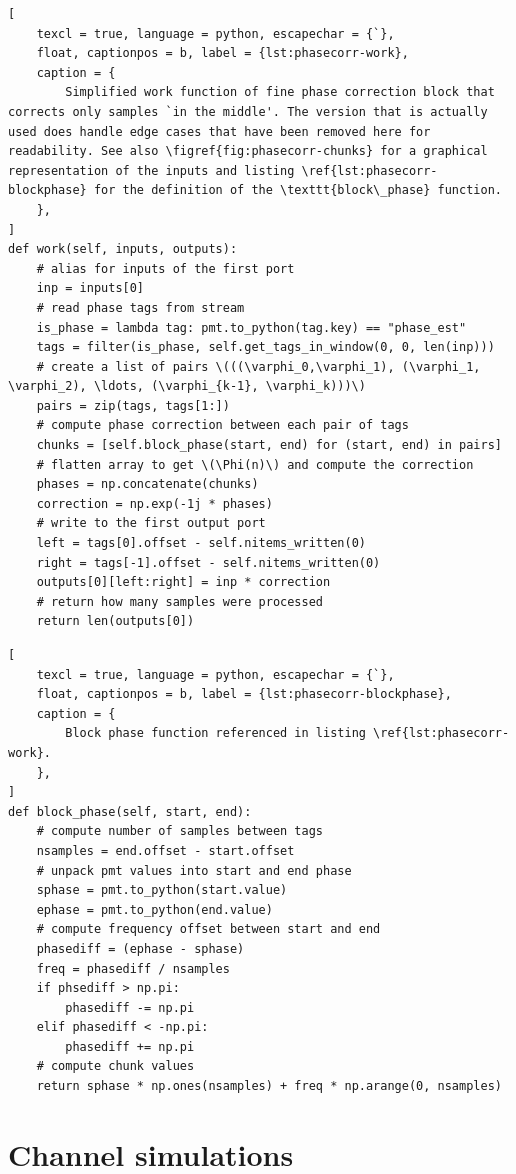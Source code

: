 \begin{lstlisting}[
	texcl = true, language = python, escapechar = {`},
	float, captionpos = b, label = {lst:phasecorr-work},
	caption = {
		Simplified work function of fine phase correction block that corrects only samples `in the middle'. The version that is actually used does handle edge cases that have been removed here for readability. See also \figref{fig:phasecorr-chunks} for a graphical representation of the inputs and listing \ref{lst:phasecorr-blockphase} for the definition of the \texttt{block\_phase} function.
	},
]
def work(self, inputs, outputs):
	# alias for inputs of the first port
	inp = inputs[0]
	# read phase tags from stream
	is_phase = lambda tag: pmt.to_python(tag.key) == "phase_est"
	tags = filter(is_phase, self.get_tags_in_window(0, 0, len(inp)))
	# create a list of pairs \(((\varphi_0,\varphi_1), (\varphi_1, \varphi_2), \ldots, (\varphi_{k-1}, \varphi_k)))\)
	pairs = zip(tags, tags[1:])
	# compute phase correction between each pair of tags
	chunks = [self.block_phase(start, end) for (start, end) in pairs]
	# flatten array to get \(\Phi(n)\) and compute the correction
	phases = np.concatenate(chunks)
	correction = np.exp(-1j * phases) 
	# write to the first output port
	left = tags[0].offset - self.nitems_written(0)
	right = tags[-1].offset - self.nitems_written(0)
	outputs[0][left:right] = inp * correction
	# return how many samples were processed
	return len(outputs[0])
\end{lstlisting}

\begin{lstlisting}[
	texcl = true, language = python, escapechar = {`},
	float, captionpos = b, label = {lst:phasecorr-blockphase},
	caption = {
		Block phase function referenced in listing \ref{lst:phasecorr-work}.
	},
]
def block_phase(self, start, end):
	# compute number of samples between tags
	nsamples = end.offset - start.offset
	# unpack pmt values into start and end phase
	sphase = pmt.to_python(start.value)
	ephase = pmt.to_python(end.value)
	# compute frequency offset between start and end
	phasediff = (ephase - sphase)
	freq = phasediff / nsamples
	if phsediff > np.pi:
		phasediff -= np.pi
	elif phasediff < -np.pi:
		phasediff += np.pi
	# compute chunk values
	return sphase * np.ones(nsamples) + freq * np.arange(0, nsamples)
\end{lstlisting}

\section{Channel simulations}

